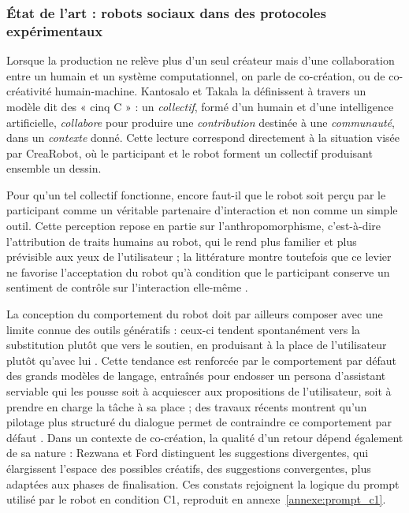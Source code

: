 \documentclass[11pt]{article}
\begin{document}
\subsubsection{État de l'art : robots sociaux dans des protocoles expérimentaux}

Lorsque la production ne relève plus d'un seul créateur mais d'une collaboration entre un humain et un système computationnel, on parle de co-création, ou de co-créativité humain-machine. Kantosalo et Takala \cite{kantosalo2020} la définissent à travers un modèle dit des « cinq C » : un \textit{collectif}, formé d'un humain et d'une intelligence artificielle, \textit{collabore} pour produire une \textit{contribution} destinée à une \textit{communauté}, dans un \textit{contexte} donné. Cette lecture correspond directement à la situation visée par CreaRobot, où le participant et le robot forment un collectif produisant ensemble un dessin.

Pour qu'un tel collectif fonctionne, encore faut-il que le robot soit perçu par le participant comme un véritable partenaire d'interaction et non comme un simple outil. Cette perception repose en partie sur l'anthropomorphisme, c'est-à-dire l'attribution de traits humains au robot, qui le rend plus familier et plus prévisible aux yeux de l'utilisateur ; la littérature montre toutefois que ce levier ne favorise l'acceptation du robot qu'à condition que le participant conserve un sentiment de contrôle sur l'interaction elle-même \cite{david2026}.

La conception du comportement du robot doit par ailleurs composer avec une limite connue des outils génératifs : ceux-ci tendent spontanément vers la substitution plutôt que vers le soutien, en produisant à la place de l'utilisateur plutôt qu'avec lui \cite{lubart2003}. Cette tendance est renforcée par le comportement par défaut des grands modèles de langage, entraînés pour endosser un persona d'assistant serviable qui les pousse soit à acquiescer aux propositions de l'utilisateur, soit à prendre en charge la tâche à sa place \cite{lu2026} ; des travaux récents montrent qu'un pilotage plus structuré du dialogue permet de contraindre ce comportement par défaut \cite{galland2025}. Dans un contexte de co-création, la qualité d'un retour dépend également de sa nature : Rezwana et Ford \cite{rezwana2025} distinguent les suggestions divergentes, qui élargissent l'espace des possibles créatifs, des suggestions convergentes, plus adaptées aux phases de finalisation. Ces constats rejoignent la logique du prompt utilisé par le robot en condition C1, reproduit en annexe~\ref{annexe:prompt_c1}.
\end{document}
